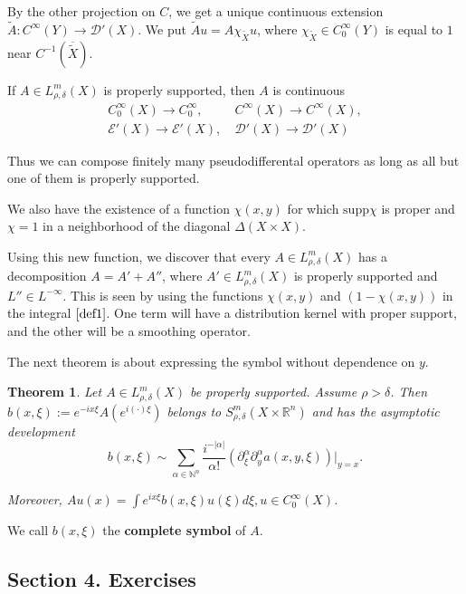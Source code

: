 \documentclass[11pt, reqno]{article}
\theoremstyle{plain}
\newtheorem*{theorem}{Theorem}
\theoremstyle{definition}
\theoremstyle{remark}
\newcommand{\RR}{\mathbb{R}}
\newcommand{\supp}{\text{supp}}
\begin{document}
By the other projection on $C$, we get a unique continuous extension $\tilde{A}: C^\infty(Y)
\to \mathcal{D}'(X)$.  We put $\tilde{A}u = A\chi_{\tilde{X}}u$, where $\chi_{\tilde{X}}\in 
C_0^\infty(Y)$ is equal to $1$ near $C^{-1}(\overline{\tilde{X}})$.

If $A \in L_{\rho,\delta}^m(X)$ is properly supported, then $A$ is continuous 
\begin{align*}
    C_0^\infty(X) \to C_0^\infty,\ & C^\infty(X) \to C^\infty(X),\\
    \mathcal{E}'(X) \rightarrow \mathcal{E}'(X),\ & \mathcal{D}'(X) \to \mathcal{D}'(X)
\end{align*}

Thus we can compose finitely many pseudodifferental operators as long as all but one of
them is properly supported.

We also have the existence of a function $\chi(x,y)$ for which $\supp \chi$ is proper and
$\chi = 1$ in a neighborhood of the diagonal $\Delta(X\times X)$. 

Using this new function, we discover that every $A \in L_{\rho,\delta}^m(X)$ has a decomposition 
$A = A' + A''$, where $A' \in L_{\rho,\delta}^m(X)$ is properly supported and $L'' \in L^{-\infty}$.
This is seen by using the functions $\chi(x,y)$ and $(1 - \chi(x,y))$ in the
integral $\ref{def1}$. One term will have a distribution kernel with proper support,
and the other will be a smoothing operator. 

The next theorem is about expressing the symbol without dependence on $y$. 

\begin{theorem} Let $A \in L_{\rho,\delta}^m(X)$ be properly supported. Assume $\rho > \delta$. 
    Then $b(x,\xi) := e^{-ix\xi}A(e^{i(\cdot)\xi})$ belongs to $S_{\rho,\delta}^m (X \times \RR^n)$
    and has the asymptotic development 
    \[
        b(x,\xi) \sim \sum_{\alpha \in \mathbb{N}^n} \frac{i^{-|\alpha|}}{\alpha !} (\partial_\xi^\alpha
        \partial_y^\alpha a(x,y,\xi))|_{y = x}.
    \]

        Moreover, $Au(x) = \int e^{ix\xi}b(x,\xi)\hat{u}(\xi)d\xi, u \in C_0^\infty(X)$.
\end{theorem}

We call $b(x,\xi)$ the \textbf{complete symbol} of $A$. 

\subsection{Section 4. Exercises}
\end{document}
